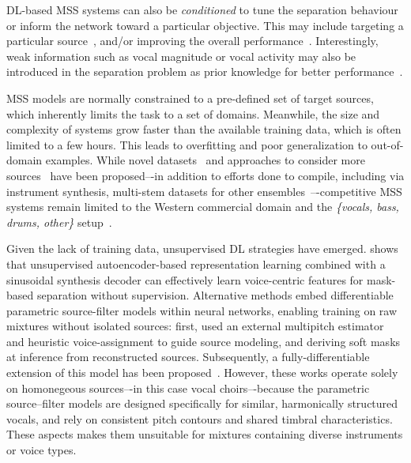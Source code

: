 \acrshort{DL}-based \acrshort{MSS} systems can also be \textit{conditioned} to tune the separation behaviour or inform the network toward a particular objective. This may include targeting a particular source~\citep{meseguer-unet,petermann-choir}, and/or improving the overall performance~\citep{parekh-motion}. Interestingly, weak information such as vocal magnitude or vocal activity may also be introduced in the separation problem as prior knowledge for better performance~\citep{schulze-weakly}.



\acrshort{MSS} models are normally constrained to a pre-defined set of target sources, which inherently limits the task to a set of domains. Meanwhile, the size and complexity of systems grow faster than the available training data, which is often limited to a few hours. This leads to overfitting and poor generalization to out-of-domain examples. While novel datasets~\citep{pereira-moisesdb,zang-music_restoration} and approaches to consider more sources~\citep{manilow-jukebox,wang-source_fewshot,watcharasupat-agnostic} have been proposed–-in addition to efforts done to compile, including via instrument synthesis, multi-stem datasets for other ensembles~\citep{manilow-slakh,cuesta-cantoria,sarkar-ensembleset}–-competitive \acrshort{MSS} systems remain limited to the Western commercial domain and the \textit{\{vocals, bass, drums, other\}} setup~\citep{richard-audio}.



Given the lack of training data, unsupervised \acrshort{DL} strategies have emerged. \citep{mimilakis-unsupervised} shows that unsupervised autoencoder-based representation learning combined with a sinusoidal synthesis decoder can effectively learn voice-centric features for mask-based separation without supervision. Alternative methods embed differentiable parametric source-filter models within neural networks, enabling training on raw mixtures without isolated sources: first, \citep{schulze-unsupervised} used an external multipitch estimator and heuristic voice-assignment to guide source modeling, and deriving soft masks at inference from reconstructed sources. Subsequently, a fully-differentiable extension of this model has been proposed~\citep{richard-fully}. However, these works operate solely on homonegeous sources–-in this case vocal choirs–-because the parametric source–filter models are designed specifically for similar, harmonically structured vocals, and rely on consistent pitch contours and shared timbral characteristics. These aspects makes them unsuitable for mixtures containing diverse instruments or voice types.


